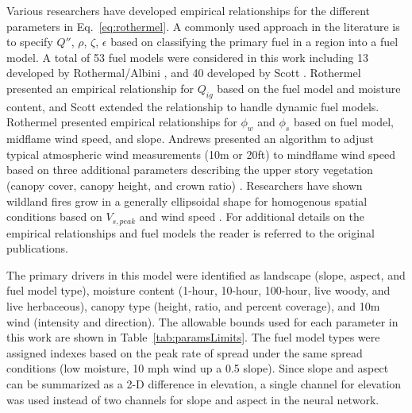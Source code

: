 \documentclass[twocolumn]{svjour3}          %
\begin{document}
Various researchers have developed empirical relationships for the
different parameters in Eq.~\ref{eq:rothermel}. A commonly used approach
in the literature is to specify $Q''$, $\rho$, $\zeta$, $\epsilon$
based on classifying the primary fuel in a region into a fuel model.
A total of 53 fuel models were considered in this work including
13 developed by Rothermal/Albini \cite{rothermel1972mathematical,albini1976estimating},
and 40 developed by Scott \cite{scott2005standard}. Rothermel presented
an empirical relationship for $Q_{ig}$ based on the fuel model and
moisture content, and Scott extended the relationship to handle dynamic
fuel models. Rothermel presented empirical relationships for $\phi_{w}$
and $\phi_{s}$ based on fuel model, midflame wind speed, and slope.
Andrews presented an algorithm to adjust typical atmospheric wind
measurements (10m or 20ft) to mindflame wind speed based on three
additional parameters describing the upper story vegetation
(canopy cover, canopy height, and crown ratio)
\cite{andrews2012modeling}. Researchers have shown wildland fires grow
in a generally ellipsoidal shape for homogenous spatial conditions
based on $V_{s,peak}$ and wind speed
\cite{finney1999mechanistic,wagner1969simple,green1983fire}.
For additional details on the empirical relationships and fuel models the
reader is referred to the original publications.

The primary drivers in this model were identified as
landscape (slope, aspect, and fuel model type),
moisture content (1-hour, 10-hour, 100-hour, live woody, and live herbaceous),
canopy type (height, ratio, and percent coverage),
and 10m wind (intensity and direction). The allowable bounds used for
each parameter in this work are shown in Table~\ref{tab:paramsLimits}.
The fuel model types were assigned indexes based on the peak rate of spread
under the same spread conditions (low moisture, 10 mph wind up a 0.5 slope).
Since slope and aspect can be summarized as a 2-D difference in elevation,
a single channel for elevation was used instead of two channels for slope
and aspect in the neural network.
\end{document}
